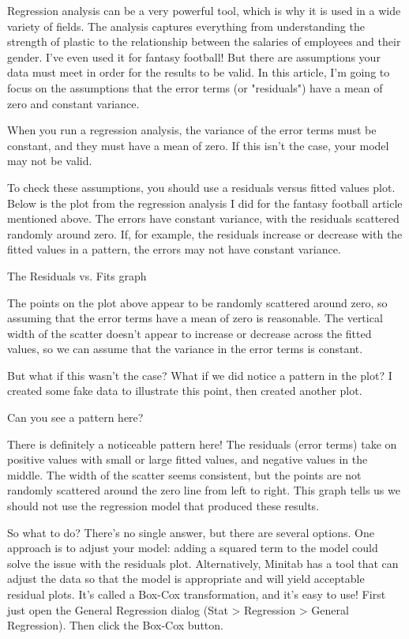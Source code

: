 Regression analysis can be a very powerful tool, which is why it is used in a wide variety of fields. The analysis captures everything from understanding the strength of plastic to the relationship between the salaries of employees and their gender. I've even used it for fantasy football! But there are assumptions your data must meet in order for the results to be valid. In this article, I'm going to focus on the assumptions that the error terms (or "residuals") have a mean of zero and constant variance.

When you run a regression analysis, the variance of the error terms must be constant, and they must have a mean of zero. If this isn't the case, your model may not be valid.
 
To check these assumptions, you should use a residuals versus fitted values plot. Below is the plot from the regression analysis I did for the fantasy football article mentioned above. The errors have constant variance, with the residuals scattered randomly around zero. If, for example, the residuals increase or decrease with the fitted values in a pattern, the errors may not have constant variance.


The Residuals vs. Fits graph


The points on the plot above appear to be randomly scattered around zero, so assuming that the error terms have a mean of zero is reasonable. The vertical width of the scatter doesn't appear to increase or decrease across the fitted values, so we can assume that the variance in the error terms is constant.

But what if this wasn't the case? What if we did notice a pattern in the plot? I created some fake data to illustrate this point, then created another plot.


Can you see a pattern here?

There is definitely a noticeable pattern here! The residuals (error terms) take on positive values with small or large fitted values, and negative values in the middle. The width of the scatter seems consistent, but the points are not randomly scattered around the zero line from left to right.  This graph tells us we should not use the regression model that produced these results.

So what to do? There's no single answer, but there are several options. One approach is to adjust your model: adding a squared term to the model could solve the issue with the residuals plot.  Alternatively, Minitab has a tool that can adjust the data so that the model is appropriate and will yield acceptable residual plots. It's called a Box-Cox transformation, and it's easy to use! First just open the General Regression dialog (Stat > Regression > General Regression).  Then click the Box-Cox button.


